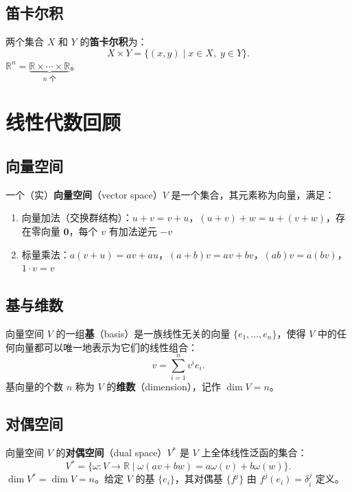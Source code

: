 \subsection{笛卡尔积}

两个集合 $X$ 和 $Y$ 的\textbf{笛卡尔积}为：
\begin{equation}
    X \times Y = \{(x, y) \mid x \in X, \; y \in Y\}.
\end{equation}
$\mathbb{R}^n = \underbrace{\mathbb{R} \times \cdots \times \mathbb{R}}_{n \text{ 个}}$。

\section{线性代数回顾}

\subsection{向量空间}

一个（实）\textbf{向量空间}（vector space）$V$ 是一个集合，其元素称为向量，满足：
\begin{enumerate}
    \item 向量加法（交换群结构）：$u + v = v + u$，$(u+v)+w = u+(v+w)$，存在零向量 $\mathbf{0}$，每个 $v$ 有加法逆元 $-v$
    \item 标量乘法：$a(v+u) = av + au$，$(a+b)v = av + bv$，$(ab)v = a(bv)$，$1 \cdot v = v$
\end{enumerate}

\subsection{基与维数}

向量空间 $V$ 的一组\textbf{基}（basis）是一族线性无关的向量 $\{e_1, \ldots, e_n\}$，使得 $V$ 中的任何向量都可以唯一地表示为它们的线性组合：
\begin{equation}
    v = \sum_{i=1}^n v^i e_i.
\end{equation}
基向量的个数 $n$ 称为 $V$ 的\textbf{维数}（dimension），记作 $\dim V = n$。

\subsection{对偶空间}

向量空间 $V$ 的\textbf{对偶空间}（dual space）$V^*$ 是 $V$ 上全体线性泛函的集合：
\begin{equation}
    V^* = \{\omega: V \to \mathbb{R} \mid \omega(av + bw) = a\omega(v) + b\omega(w)\}.
\end{equation}
$\dim V^* = \dim V = n$。给定 $V$ 的基 $\{e_i\}$，其对偶基 $\{f^j\}$ 由 $f^j(e_i) = \delta^j_i$ 定义。

